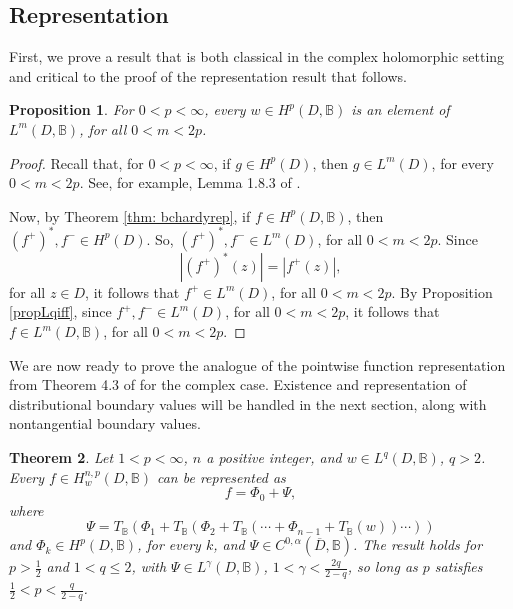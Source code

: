 \documentclass[suppldata]{interact}
\theoremstyle{plain}%
\newtheorem{theorem}{Theorem}[section]
\newtheorem{prop}[theorem]{Proposition}
\theoremstyle{definition}
\theoremstyle{remark}
\newcommand{\bc}{\mathbb{B}}
\begin{document}
\subsection{Representation}

First, we prove a result that is both classical in the complex holomorphic setting and critical to the proof of the representation result that follows.

\begin{prop}\label{Prop: bchardymlessthan2p}
For $0 < p < \infty$, every $w \in H^p(D,\bc)$ is an element of $L^m(D,\bc)$, for all $0 < m < 2p$. 
\end{prop}

\begin{proof}
Recall that, for $0 < p < \infty$, if $g \in H^p(D)$, then $g \in L^m(D)$, for every $0 < m < 2p$. See, for example, Lemma 1.8.3 of \cite{KlimBook}. 

Now, by Theorem \ref{thm: bchardyrep}, if $f \in H^p(D, \bc)$, then $(f^+)^*,f^- \in H^p(D)$. So, $(f^+)^*,f^- \in L^m(D)$, for all $0 < m < 2p$. Since 
\[
        |(f^+)^*(z)| = |f^+(z)|,
\]
for all $z \in D$, it follows that $f^+ \in L^m(D)$, for all $0 < m < 2p$. By Proposition \ref{propLqiff}, since $f^+, f^- \in L^m(D)$, for all $0 < m < 2p$, it follows that $f \in L^m(D,\bc)$, for all $0 < m < 2p$. 

\end{proof}

We are now ready to prove the analogue of the pointwise function representation from Theorem 4.3 of \cite{WB} for the complex case. Existence and representation of distributional boundary values will be handled in the next section, along with nontangential boundary values. 

\begin{theorem}\label{Thm: bchigherhardyrep}
    Let $1< p < \infty$, $n$ a positive integer, and $w \in L^q(D,\bc)$, $q>2$. Every $f \in H^{n,p}_{w}(D,\bc)$ can be represented as 
    \[
        f = \Phi_0 + \Psi,
    \]
    where
    \[
        \Psi = T_\bc( \Phi_1 + T_\bc( \Phi_2 + T_\bc( \cdots + \Phi_{n-1} + T_\bc(w))\cdots) )
    \]
    and $\Phi_k \in H^p(D,\bc)$, for every $k$, and $\Psi \in C^{0,\alpha}(\overline{D},\bc)$. The result holds for $p > \frac{1}{2}$ and $1 < q \leq 2$, with $\Psi \in L^\gamma(D,\bc)$, $1 < \gamma< \frac{2q}{2-q}$, so long as $p$ satisfies $\frac{1}{2} < p < \frac{q}{2-q}$. 
    
\end{theorem}
\end{document}
